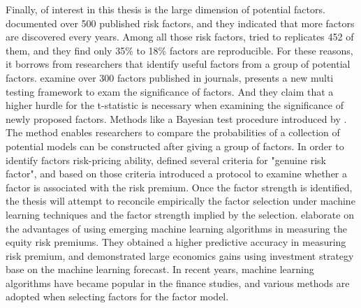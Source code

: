 Finally, of interest in this thesis is the large dimension of potential factors.
 documented over 500 published risk factors, and they indicated that more factors are discovered every years.
Among all those risk factors,  tried to replicates 452 of them, and they find only 35\% to 18\% factors are reproducible.
For these reasons, it borrows from researchers that identify useful factors from a group of potential factors.
 examine over 300 factors published in journals, presents a new multi testing framework to exam the significance of factors.
And they claim that a higher hurdle for the t-statistic is necessary when examining the significance of newly proposed factors.
Methods like a Bayesian test procedure introduced by .
The method enables researchers to compare the probabilities of a collection of potential models can be constructed after giving a group of factors.
In order to identify factors risk-pricing ability,  defined several criteria for "genuine risk factor", and based on those criteria introduced a protocol to examine whether a factor is associated with the risk premium.
Once the factor strength is identified, the thesis will attempt to reconcile empirically the factor selection under machine learning techniques and the factor strength implied by the selection.
 elaborate on the advantages of using emerging machine learning algorithms in measuring the equity risk premiums.
They obtained a higher predictive accuracy in measuring risk premium, and demonstrated large economics gains using investment strategy base on the machine learning forecast.
In recent years, machine learning algorithms have became popular in the finance studies, and various methods are adopted when selecting factors for the factor model.

